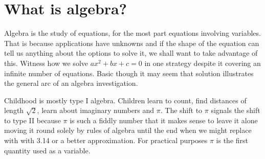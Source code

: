 \chapter{What is algebra?}

Algebra is the study of equations, for the most part equations involving variables.
That is because applications have unknowns and if 
the shape of the equation can tell us anything about the 
options to solve it, we shall want to take advantage of this.
Witness how we solve $ax^2+bx+c=0$ in one strategy despite it covering 
an infinite number of equations. Basic though it may seem that solution illustrates
the general arc of an algebra investigation.
\begin{center}
\end{center}
    
Childhood is mostly type I algebra.  Children learn to count, find distances of
length $\sqrt{2}$, learn about imaginary numbers and $\pi$.  The shift to $\pi$
signals the shift to type II because $\pi$ is such a fiddly number that it
makes sense to leave it alone moving it round solely by rules of algebra until
the end when we might replace with with 3.14 or a better approximation. For
practical purposes $\pi$ is the first quantity used as a variable. 

